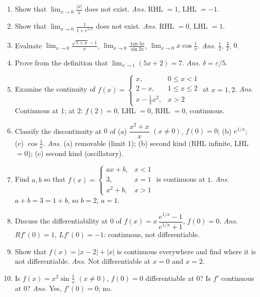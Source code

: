 \begin{psetbox}
\begin{enumerate}
\item Show that $\displaystyle\lim_{x\to0}\frac{|x|}{x}$ does not exist. \emph{Ans.} RHL $=1$, LHL $=-1$.
\item Show that $\displaystyle\lim_{x\to0}\frac{1}{1+e^{1/x}}$ does not exist. \emph{Ans.} RHL $=0$, LHL $=1$.
\item Evaluate $\displaystyle\lim_{x\to0}\frac{\sqrt{1+x}-1}{x}$, $\displaystyle\lim_{x\to0}\frac{\tan3x}{\sin2x}$, $\displaystyle\lim_{x\to0}x\cos\frac1{x}$. \emph{Ans.} $\frac12$, $\frac32$, $0$.
\item Prove from the definition that $\lim_{x\to1}(5x+2)=7$. \emph{Ans.} $\delta=\varepsilon/5$.
\item Examine the continuity of $f(x)=\begin{cases}x,&0\le x<1\\ 2-x,&1\le x\le2\\ x-\frac12x^2,&x>2\end{cases}$ at $x=1,2$. \emph{Ans.} Continuous at $1$; at $2$: $f(2)=0$, LHL $=0$, RHL $=0$, continuous.
\item Classify the discontinuity at $0$ of (a) $\dfrac{x^2+x}{x}$ $(x\ne0)$, $f(0)=0$; (b) $e^{1/x}$; (c) $\cos\frac1x$. \emph{Ans.} (a) removable (limit $1$); (b) second kind (RHL infinite, LHL $=0$); (c) second kind (oscillatory).
\item Find $a,b$ so that $f(x)=\begin{cases}ax+b,&x<1\\ 3,&x=1\\ x^2+b,&x>1\end{cases}$ is continuous at $1$. \emph{Ans.} $a+b=3=1+b$, so $b=2$, $a=1$.
\item Discuss the differentiability at $0$ of $f(x)=x\,\dfrac{e^{1/x}-1}{e^{1/x}+1}$, $f(0)=0$. \emph{Ans.} $Rf'(0)=1$, $Lf'(0)=-1$: continuous, not differentiable.
\item Show that $f(x)=|x-2|+|x|$ is continuous everywhere and find where it is not differentiable. \emph{Ans.} Not differentiable at $x=0$ and $x=2$.
\item Is $f(x)=x^2\sin\frac1x$ $(x\ne0)$, $f(0)=0$ differentiable at $0$? Is $f'$ continuous at $0$? \emph{Ans.} Yes, $f'(0)=0$; no.
\end{enumerate}
\end{psetbox}

